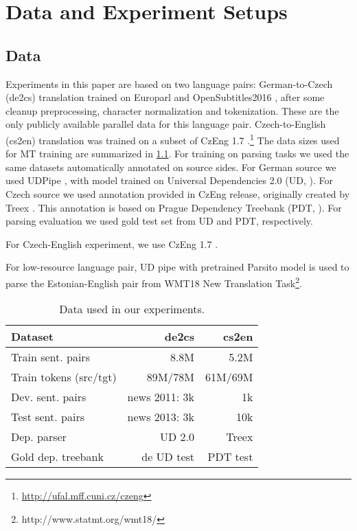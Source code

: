 \chapter{Data and Experiment Setups}

\section{Data}
Experiments in this paper are based on two language pairs: German-to-Czech (de2cs)
translation trained on Europarl  and OpenSubtitles2016
, after some cleanup preprocessing, character normalization
and tokenization. These are the only publicly
available parallel data for this language pair.
Czech-to-English (cs2en) translation was
trained on a subset of CzEng 1.7
.\footnote{\url{http://ufal.mff.cuni.cz/czeng}}
The data sizes used for MT training are summarized in \cref{tab:data}.
For training on parsing tasks we used the same datasets automatically
annotated on source sides. For German source we used UDPipe ,
with model trained on Universal Dependencies 2.0 (UD, ).
For Czech
source we used annotation provided in CzEng release, originally created 
by Treex . This annotation is based on Prague Dependency Treebank
(PDT, ). For parsing evaluation we used gold test set from UD
and PDT, respectively.

For Czech-English experiment, we use CzEng 1.7 \citep{czeng16:2016}.

For low-resource language pair, UD pipe with pretrained Parsito model \citep{DBLP:conf/conll/StrakaS17} is used to parse the Estonian-English pair from WMT18 New Translation Task\footnote{http://www.statmt.org/wmt18/}.

\begin{table}
\begin{center}
\small
\begin{tabular}{lrr}
\textbf{Dataset}	& \textbf{de2cs} & \textbf{cs2en} \\
\hline
Train sent. pairs     		& 8.8M      	& 5.2M \\
Train tokens (src/tgt)		& 89M/78M  		& 61M/69M \\
Dev. sent. pairs         	& news 2011: 3k & 1k \\ %
Test sent. pairs          	& news 2013: 3k & 10k \\
Dep. parser				  	& UD 2.0 & Treex \\
Gold dep. treebank     & de UD test & PDT test  \\
\end{tabular}
\end{center}
\caption{Data used in our experiments.}
\label{tab:data}
\end{table}

